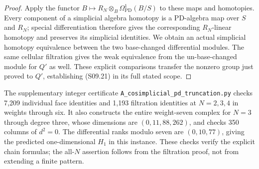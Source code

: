 \begin{proof}
Apply the functor
$B\mapsto R_N\otimes_B\Omega^1_{\mathrm{PD}}(B/S)$
to these maps and homotopies.  Every component of a
simplicial algebra homotopy is a PD-algebra map over
$S$ and $R_N$; special differentiation therefore gives
the corresponding $R_N$-linear homotopy and preserves
its simplicial identities.  We obtain an actual simplicial
homotopy equivalence between the two base-changed
differential modules.  The same cellular filtration gives
the weak equivalence from the un-base-changed module
for $Q'$ as well.  These explicit comparisons transfer
the nonzero group just proved to $Q'$, establishing
(S09.21) in its full stated scope.
\end{proof}

The supplementary integer certificate
\texttt{A\_cosimplicial\_pd\_truncation.py} checks 7,209
individual face identities and 1,193 filtration identities
at $N=2,3,4$ in weights through six.  It also constructs
the entire weight-seven complex for $N=3$ through degree
three, whose dimensions are $(0,11,88,262)$, and checks
350 columns of $d^2=0$.  The differential ranks modulo
seven are $(0,10,77)$, giving the predicted one-dimensional
$H_1$ in this instance.  These checks verify the explicit
chain formulas; the all-$N$ assertion follows from the
filtration proof, not from extending a finite pattern.
